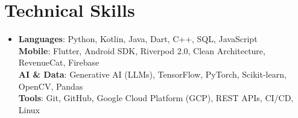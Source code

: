\documentclass[letterpaper,11pt]{article}
\newcommand{\resumeSubHeadingListStart}{\begin{itemize}[leftmargin=0.15in, label={}]}
\newcommand{\resumeSubHeadingListEnd}{\end{itemize}}
\begin{document}
\section{Technical Skills}
 \resumeSubHeadingListStart
    \item{
     \textbf{Languages}{: Python, Kotlin, Java, Dart, C++, SQL, JavaScript} \\
     \vspace{2pt}
     \textbf{Mobile}{: Flutter, Android SDK, Riverpod 2.0, Clean Architecture, RevenueCat, Firebase} \\
     \vspace{2pt}
     \textbf{AI \& Data}{: Generative AI (LLMs), TensorFlow, PyTorch, Scikit-learn, OpenCV, Pandas} \\
     \vspace{2pt}
     \textbf{Tools}{: Git, GitHub, Google Cloud Platform (GCP), REST APIs, CI/CD, Linux}
    }
 \resumeSubHeadingListEnd


\end{document}
